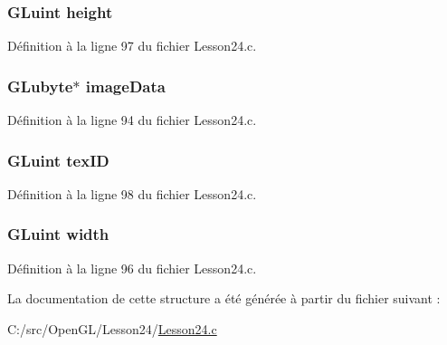 \subsubsection[{height}]{\setlength{\rightskip}{0pt plus 5cm}G\+Luint height}\label{struct_texture_image_aa9d50b6eccecd7c670e4f28f896b39fc}


Définition à la ligne 97 du fichier Lesson24.\+c.

\hypertarget{struct_texture_image_adbd4691e53fc0f8845c47dcd52ecb9ba}{}
\subsubsection[{image\+Data}]{\setlength{\rightskip}{0pt plus 5cm}G\+Lubyte$\ast$ image\+Data}\label{struct_texture_image_adbd4691e53fc0f8845c47dcd52ecb9ba}


Définition à la ligne 94 du fichier Lesson24.\+c.

\hypertarget{struct_texture_image_ae92e5daff8bbce49af292026f95dc382}{}
\subsubsection[{tex\+I\+D}]{\setlength{\rightskip}{0pt plus 5cm}G\+Luint tex\+I\+D}\label{struct_texture_image_ae92e5daff8bbce49af292026f95dc382}


Définition à la ligne 98 du fichier Lesson24.\+c.

\hypertarget{struct_texture_image_a371e2e2e152ab2d20d47f9868118e0e7}{}
\subsubsection[{width}]{\setlength{\rightskip}{0pt plus 5cm}G\+Luint width}\label{struct_texture_image_a371e2e2e152ab2d20d47f9868118e0e7}


Définition à la ligne 96 du fichier Lesson24.\+c.



La documentation de cette structure a été générée à partir du fichier suivant \+:\begin{DoxyCompactItemize}
\item 
C\+:/src/\+Open\+G\+L/\+Lesson24/\hyperlink{_lesson24_8c}{Lesson24.\+c}\end{DoxyCompactItemize}
